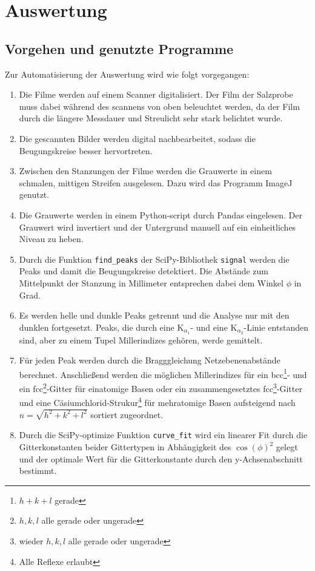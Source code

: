 \section{Auswertung}
\subsection{Vorgehen und genutzte Programme}
Zur Automatisierung der Auswertung wird wie folgt vorgegangen:
\begin{enumerate}
  \item Die Filme werden auf einem Scanner digitalisiert.
  Der Film der Salzprobe muss dabei während des scannens von oben beleuchtet werden,
  da der Film durch die längere Messdauer und Streulicht sehr stark belichtet
  wurde.
  \item Die gescannten Bilder werden digital nachbearbeitet, sodass die
  Beugungskreise besser hervortreten.
  \item Zwischen den Stanzungen der Filme werden die Grauwerte in einem schmalen,
  mittigen Streifen ausgelesen.
  Dazu wird das Programm ImageJ\cite{Schneider2012} genutzt.
  \item Die Grauwerte werden in einem Python\cite{python}-script
  durch Pandas\cite{mckinney-proc-scipy-2010} eingelesen.
  Der Grauwert wird invertiert und der Untergrund manuell auf ein
  einheitliches Niveau zu heben.
  \item Durch die Funktion \texttt{find\_peaks} der SciPy\cite{scipy}-Bibliothek
  \texttt{signal} werden die Peaks und damit die Beugungskreise detektiert.
  Die Abstände zum Mittelpunkt der Stanzung in Millimeter entsprechen dabei
  dem Winkel $\phi$ in Grad.
  \item Es werden helle und dunkle Peaks getrennt und die Analyse nur mit den dunklen
  fortgesetzt.
  Peaks, die durch eine K$_{\alpha_{1}}$- und eine K$_{\alpha_{2}}$-Linie
  entstanden sind, aber zu einem Tupel Millerindizes gehören, werde gemittelt.
  \item Für jeden Peak werden durch die Bragggleichung Netzebenenabstände
  berechnet. Anschließend werden die möglichen Millerindizes für ein bcc\footnote{$h+k+l$ gerade}-
  und ein fcc\footnote{$h, k, l$ alle gerade oder ungerade}-Gitter für einatomige
  Basen oder ein zusammengesetztes fcc\footnote{wieder $h, k, l$ alle gerade oder
  ungerade}-Gitter und eine Cäsiumchlorid-Strukur\footnote{Alle Reflexe erlaubt}
  für mehratomige Basen aufsteigend nach $n=\sqrt{h^{2}+k^{2}+l^{2}}$ sortiert zugeordnet.
  \item Durch die SciPy-optimize Funktion \texttt{curve\_fit} wird ein linearer
  Fit durch die Gitterkonstanten beider Gittertypen in Abhängigkeit
  des $\cos{(\phi)}^{2}$ gelegt und der optimale Wert für die Gitterkonstante
  durch den y-Achsenabschnitt bestimmt.
\end{enumerate}

